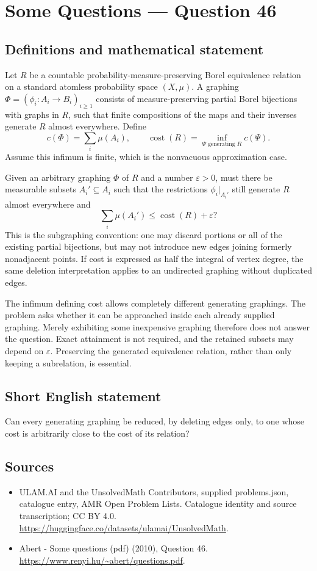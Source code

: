 \documentclass[11pt,a4paper]{article}
\begin{document}
\section*{Some Questions — Question 46}\label{statement}

\subsection{Definitions and mathematical statement}
Let $R$ be a countable probability-measure-preserving Borel equivalence relation on a standard atomless probability space $(X,\mu)$. A graphing $\Phi=(\phi_i:A_i\to B_i)_{i\geq1}$ consists of measure-preserving partial Borel bijections with graphs in $R$, such that finite compositions of the maps and their inverses generate $R$ almost everywhere. Define
\[
 c(\Phi)=\sum_i\mu(A_i),\qquad
 \operatorname{cost}(R)=\inf_{\Psi\text{ generating }R}c(\Psi).
\]
Assume this infimum is finite, which is the nonvacuous approximation case.

Given an arbitrary graphing $\Phi$ of $R$ and a number $\varepsilon>0$, must there be measurable subsets $A_i'\subseteq A_i$ such that the restrictions $\phi_i|_{A_i'}$ still generate $R$ almost everywhere and
\[
 \sum_i\mu(A_i')\leq\operatorname{cost}(R)+\varepsilon?
\]
This is the subgraphing convention: one may discard portions or all of the existing partial bijections, but may not introduce new edges joining formerly nonadjacent points. If cost is expressed as half the integral of vertex degree, the same deletion interpretation applies to an undirected graphing without duplicated edges.

The infimum defining cost allows completely different generating graphings. The problem asks whether it can be approached inside each already supplied graphing. Merely exhibiting some inexpensive graphing therefore does not answer the question. Exact attainment is not required, and the retained subsets may depend on $\varepsilon$. Preserving the generated equivalence relation, rather than only keeping a subrelation, is essential.
\subsection{Short English statement}
Can every generating graphing be reduced, by deleting edges only, to one whose cost is arbitrarily close to the cost of its relation?
\subsection{Sources}
\begin{itemize}
\item[S1] ULAM.AI and the UnsolvedMath Contributors, supplied problems.json, catalogue entry, AMR Open Problem Lists. Catalogue identity and source transcription; CC BY 4.0.
\url{https://huggingface.co/datasets/ulamai/UnsolvedMath}.
\item[S2] Abert - Some questions (pdf) (2010), Question 46. 
\url{https://www.renyi.hu/~abert/questions.pdf}.
\end{itemize}
\end{document}
